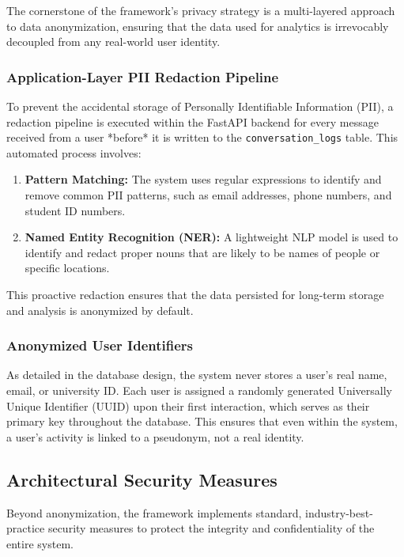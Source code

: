 The cornerstone of the framework's privacy strategy is a multi-layered approach to data anonymization, ensuring that the data used for analytics is irrevocably decoupled from any real-world user identity.

\subsubsection{Application-Layer PII Redaction Pipeline}
To prevent the accidental storage of Personally Identifiable Information (PII), a redaction pipeline is executed within the FastAPI backend for every message received from a user *before* it is written to the \texttt{conversation\_logs} table. This automated process involves:
\begin{enumerate}
    \item \textbf{Pattern Matching:} The system uses regular expressions to identify and remove common PII patterns, such as email addresses, phone numbers, and student ID numbers.
    \item \textbf{Named Entity Recognition (NER):} A lightweight NLP model is used to identify and redact proper nouns that are likely to be names of people or specific locations.
\end{enumerate}
This proactive redaction ensures that the data persisted for long-term storage and analysis is anonymized by default.

\subsubsection{Anonymized User Identifiers}
As detailed in the database design, the system never stores a user's real name, email, or university ID. Each user is assigned a randomly generated Universally Unique Identifier (UUID) upon their first interaction, which serves as their primary key throughout the database. This ensures that even within the system, a user's activity is linked to a pseudonym, not a real identity.

\subsection{Architectural Security Measures}

Beyond anonymization, the framework implements standard, industry-best-practice security measures to protect the integrity and confidentiality of the entire system.

